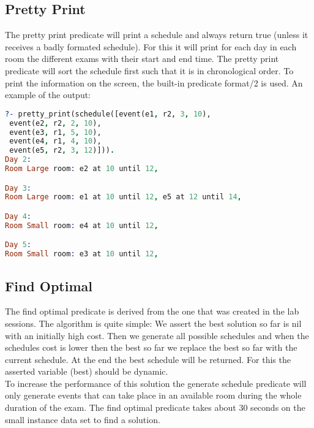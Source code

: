 \documentclass[11pt]{article}
\begin{document}
\subsection{Pretty Print}
The pretty print predicate will print a schedule and always return true (unless it receives a badly formated schedule). For this it will print for each day in each room the different exams with their start and end time. The pretty print predicate will sort the schedule first such that it is in chronological order. To print the information on the screen, the built-in predicate format/2 is used. An example of the output:
\begin{lstlisting}[basicstyle=\small,language=prolog]
?- pretty_print(schedule([event(e1, r2, 3, 10),
 event(e2, r2, 2, 10),
 event(e3, r1, 5, 10),
 event(e4, r1, 4, 10),
 event(e5, r2, 3, 12)])).
Day 2:
Room Large room: e2 at 10 until 12,

Day 3:
Room Large room: e1 at 10 until 12, e5 at 12 until 14,

Day 4:
Room Small room: e4 at 10 until 12,

Day 5:
Room Small room: e3 at 10 until 12,
\end{lstlisting}

\subsection{Find Optimal}
The find optimal predicate is derived from the one that was created in the lab sessions. The algorithm is quite simple: We assert the best solution so far is nil with an initially high cost. Then we generate all possible schedules and when the schedules cost is lower then the best so far we replace the best so far with the current schedule. At the end the best schedule will be returned. For this the asserted variable (best) should be dynamic.\\
To increase the performance of this solution the generate schedule predicate will only generate events that can take place in an available room during the whole duration of the exam. The find optimal predicate takes about 30 seconds on the small instance data set to find a solution.
\end{document}
